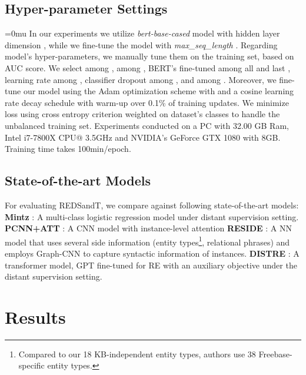 \documentclass[11pt,a4paper]{article}
\begin{document}
\subsection{Hyper-parameter Settings}
\begingroup
\thickmuskip=0mu
\setlength{\thickmuskip}{0mu}
In our experiments we utilize \textit{bert-base-cased} model with hidden layer dimension , while we fine-tune the model with \textit{max\_seq\_length} . Regarding model's hyper-parameters, we manually tune them on the training set, based on AUC score. We select  among ,  among , BERT's fine-tuned  among all and last , learning rate  among , classifier dropout  among , and  among . Moreover, we fine-tune our model using the Adam optimization scheme \cite{Kingma2015} with  and a cosine learning rate decay schedule with warm-up over 0.1\% of training updates. We minimize loss using cross entropy criterion weighted on dataset's classes to handle the unbalanced training set. Experiments conducted on a PC with 32.00 GB Ram, Intel i7-7800X CPU@ 3.5GHz and NVIDIA's GeForce GTX 1080 with 8GB. Training time takes 100min/epoch.
\endgroup


\subsection{State-of-the-art Models}
For evaluating REDSandT, we compare against following state-of-the-art models:
\newline
\textbf{Mintz} \cite{Mintz2009}: A multi-class logistic regression model under distant supervision setting.
\newline
\textbf{PCNN+ATT} \cite{Lin2016}: A CNN model with instance-level attention
\newline
\textbf{RESIDE} \cite{Vashishth2018}: A NN model that uses several side information (entity types\footnote{Compared to our 18 KB-independent entity types, authors use 38 Freebase-specific entity types.}, relational phrases) and employs Graph-CNN to capture syntactic information of instances. 
\newline
\textbf{DISTRE} \cite{Alt2019}: A transformer model, GPT fine-tuned for RE with an auxiliary objective under the distant supervision setting.



\section{Results}
\label{sec:results}
\end{document}
